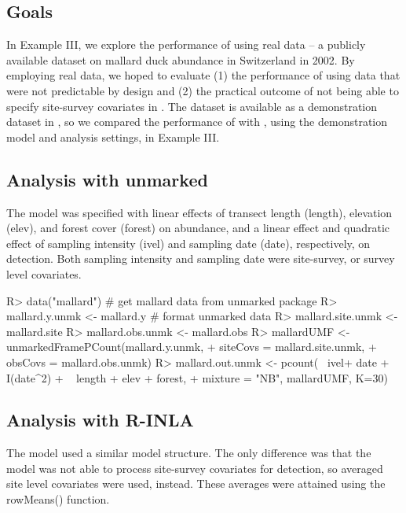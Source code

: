 \documentclass[article]{jss}
\begin{document}
\subsection[Goals]{Goals}
In Example III, we explore the performance of  using real data -- a publicly available dataset on mallard duck abundance in Switzerland in 2002. By employing real data, we hoped to evaluate (1) the performance of  using data that were not predictable by design and (2) the practical outcome of not being able to specify site-survey covariates in . The dataset is available as a demonstration dataset in , so we compared the performance of  with , using the demonstration model and analysis settings, in Example III.

\subsection[Analysis with unmarked]{Analysis with unmarked}
The  model was specified with linear effects of transect length (length), elevation (elev), and forest cover (forest) on abundance, and a linear effect and quadratic effect of sampling intensity (ivel) and sampling date (date), respectively, on detection. Both sampling intensity and sampling date were site-survey, or survey level covariates.

\begin{CodeInput}
R> data("mallard") # get mallard data from unmarked package
R> mallard.y.unmk <- mallard.y # format unmarked data
R> mallard.site.unmk <- mallard.site
R> mallard.obs.unmk <- mallard.obs
R> mallardUMF <- unmarkedFramePCount(mallard.y.unmk, 
+                                    siteCovs = mallard.site.unmk,
+                                    obsCovs = mallard.obs.unmk)
R> mallard.out.unmk <- pcount(~ ivel+ date + I(date^2)
+                             ~ length + elev + forest,
+                               mixture = "NB", mallardUMF, K=30) 
\end{CodeInput}

\subsection[Analysis with R-INLA]{Analysis with R-INLA}
The  model used a similar model structure. The only difference was that the  model was not able to process site-survey covariates for detection, so averaged site level covariates were used, instead. These averages were attained using the rowMeans() function.
\end{document}
